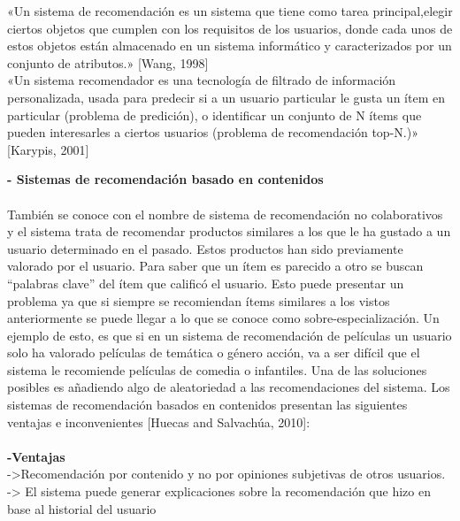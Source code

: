 \begin{enumerate}
    «Un sistema de recomendación es un sistema que tiene como tarea principal,elegir ciertos objetos que cumplen con los requisitos de los usuarios, donde cada unos de estos objetos están almacenado en un sistema informático y caracterizados por un conjunto de atributos.» [Wang, 1998]\\
    «Un sistema recomendador es una tecnología de filtrado de información personalizada, usada para predecir si a un usuario particular le gusta un ítem en particular (problema de predición), o identificar un conjunto de N ítems que pueden interesarles a ciertos usuarios (problema de recomendación top-N.)» [Karypis, 2001]

    
    \textbf{- Sistemas de recomendación basado en contenidos}\\\\
    También se conoce con el nombre de sistema de recomendación no colaborativos y el sistema trata de recomendar productos similares a los que le ha gustado a un usuario determinado en el pasado. Estos productos han sido previamente valorado por el usuario. Para saber que un ítem es parecido a otro se buscan “palabras clave” del ítem que calificó el usuario. Esto puede presentar un problema ya que si siempre se recomiendan ítems similares a los vistos anteriormente se puede llegar a lo que se conoce como sobre-especialización. Un ejemplo de esto, es que si en un sistema de recomendación de películas un usuario solo ha valorado películas de temática o género acción, va a ser difícil que el sistema le recomiende películas de comedia o infantiles. Una de las soluciones posibles es añadiendo algo de aleatoriedad a las recomendaciones del sistema. Los sistemas de recomendación basados en contenidos presentan las siguientes ventajas e inconvenientes [Huecas and Salvachúa, 2010]:\\\\
    \textbf{-Ventajas}\\
    ->Recomendación por contenido y no por opiniones subjetivas de otros usuarios.\\
    -> El sistema puede generar explicaciones sobre la recomendación que hizo en base al historial del usuario


\end{enumerate}
